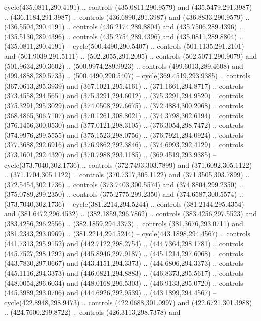 \begin{scope}[cm={{1.25,0.0,0.0,-1.25,(0.0,743.43331)}}]
    cycle(435.0811,290.4191) .. controls (435.0811,290.9579) and
    (435.5479,291.3987) .. (436.1184,291.3987) .. controls (436.6890,291.3987) and
    (436.8833,290.9579) .. (436.5504,290.4191) .. controls (436.2174,289.8804) and
    (435.7506,289.4396) .. (435.5130,289.4396) .. controls (435.2754,289.4396) and
    (435.0811,289.8804) .. (435.0811,290.4191) -- cycle(500.4490,290.5407) ..
    controls (501.1135,291.2101) and (501.9039,291.5111) .. (502.2055,291.2095) ..
    controls (502.5071,290.9079) and (501.9634,290.3602) .. (500.9974,289.9923) ..
    controls (499.6013,289.4608) and (499.4888,289.5733) .. (500.4490,290.5407) --
    cycle(369.4519,293.9385) .. controls (367.0613,295.3939) and
    (367.1021,295.4161) .. (371.1661,294.8717) .. controls (373.4558,294.5651) and
    (375.3291,294.6012) .. (375.3291,294.9520) .. controls (375.3291,295.3029) and
    (374.0508,297.6675) .. (372.4884,300.2068) .. controls (368.4865,306.7107) and
    (370.1261,308.8021) .. (374.3798,302.6194) .. controls (376.1456,300.0530) and
    (377.0121,298.3105) .. (376.3054,298.7472) .. controls (374.9976,299.5555) and
    (375.1523,298.0756) .. (376.7921,294.0924) .. controls (377.3688,292.6916) and
    (376.9862,292.3846) .. (374.6993,292.4129) .. controls (373.1601,292.4320) and
    (370.7988,293.1185) .. (369.4519,293.9385) -- cycle(373.7040,302.1736) ..
    controls (372.7493,303.7899) and (371.6092,305.1122) .. (371.1704,305.1122) ..
    controls (370.7317,305.1122) and (371.3505,303.7899) .. (372.5454,302.1736) ..
    controls (373.7403,300.5574) and (374.8804,299.2350) .. (375.0789,299.2350) ..
    controls (375.2775,299.2350) and (374.6587,300.5574) .. (373.7040,302.1736) --
    cycle(381.2214,294.5244) .. controls (381.2144,295.4354) and
    (381.6472,296.4532) .. (382.1859,296.7862) .. controls (383.4256,297.5523) and
    (383.4256,296.2556) .. (382.1859,294.3373) .. controls (381.3676,293.0711) and
    (381.2343,293.0969) .. (381.2214,294.5244) -- cycle(443.1898,294.4567) ..
    controls (441.7313,295.9152) and (442.7122,298.2754) .. (444.7364,298.1781) ..
    controls (445.7527,298.1292) and (445.8946,297.9187) .. (445.1214,297.6068) ..
    controls (443.7830,297.0667) and (443.4151,294.3373) .. (444.6806,294.3373) ..
    controls (445.1116,294.3373) and (446.0821,294.8883) .. (446.8373,295.5617) ..
    controls (448.0054,296.6034) and (448.0168,296.5303) .. (446.9133,295.0720) ..
    controls (445.3989,293.0706) and (444.6926,292.9539) .. (443.1899,294.4567) --
    cycle(422.8948,298.9473) .. controls (422.0688,301.0997) and
    (422.6721,301.3988) .. (424.7600,299.8722) .. controls (426.3113,298.7378) and

\end{scope}
